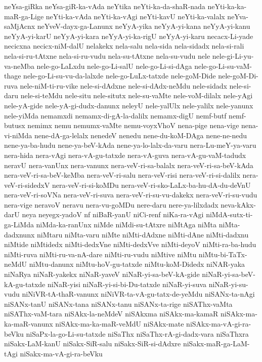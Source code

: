 {neYsa-giRka
neYsa-giR-ka-vAda
neYtika
neYti-ka-da-shaR-nada
neYti-ka-ka-maR-ga-Lige
neYti-ka-vAda
neYti-ka-vAgi
neYti-kavU
neYti-ka-valalx
neYva-saMjAcnx
neYveV-dayx-ga-Lanunx
neYyA-yika
neYyA-yi-kana
neYyA-yi-kanu
neYyA-yi-karU
neYyA-yi-kara
neYyA-yi-ka-rigU
neYyA-yi-karu
necacx-Li-yade
necicxna
necicx-niM-dalU
nelakekx
nela-salu
nela-sida
nela-sidadx
nela-si-rali
nela-si-ru-tAtxne
nela-si-ru-vudu
nela-su-tAtxne
nela-su-vudu
nele
nele-gi-Li-yu-va-neMba
nele-go-LaLxdu
nele-go-Li-salU
nele-go-Li-si-dAga
nele-go-Li-su-vaM-thage
nele-go-Li-su-vu-da-lalxde
nele-go-LuLx-tatxde
nele-goM-Dide
nele-goM-Di-ruva
nele-niM-ti-ru-vike
nele-si-dAdxne
nele-si-dAdx-neMdu
nele-sidadx
nele-si-daru
nele-si-teMdu
nele-situ
nele-situtx
nele-su-vaMte
nele-voM-dilalx
nele-yAgi
nele-yA-gide
nele-yA-gi-dudx-danunx
neleyU
nele-yalUlx
nele-yalilx
nele-yanunx
nele-yiMda
nemamxdi
nemamx-di-gA-la-dalilx
nemamx-digU
nemf-butf
nemf-butusx
nemimx
nemu
nemumx-vaMte
nemu-voyxVhoV
nena-pige
nena-vige
nena-vi-niMda
nene-dA-ga-lelalx
nenedeV
nenedu
nene-du-koM-DAga
nene-ne-nedu
nene-ya-ba-hudu
nene-ya-beV-kAda
nene-ya-lo-lalx-da-varu
nera-Lu-meY-ya-varu
nera-hida
nera-vAgi
nera-vA-gu-tatxde
nera-vA-guva
nera-vA-gu-vaM-tadudx
neravU
nera-vanUnx
nera-vanunx
nera-veV-ri-sa-balalx
nera-veV-ri-sa-beV-kAda
nera-veV-ri-sa-beV-keMba
nera-veV-ri-salu
nera-veV-risi
nera-veV-ri-si-dalilx
nera-veV-ri-sidedxV
nera-veV-ri-si-koMDu
nera-veV-ri-sko-LaLx-ba-hu-dA-du-deVnU
nera-veV-ri-soVNa
nera-veV-ri-suva
nera-veV-ri-su-vu-dakekx
nera-veV-ri-su-vudu
nera-vige
neravoV
neravu
nera-vu-goMDu
nere-daru
nere-ya-lilxdadx
neva-kAkx-darU
neya
neyegx-yadoV
nf
niBaR-yanU
niCi-renf
niKa-ra-vAgi
niMdA-sutx-ti-ga-LiMda
niMda-ka-ranUnx
niMde
niMdi-su-tAtxre
niMtAga
niMta
niMta-dadxnunx
niMtaru
niMta-varu
niMte
niMti-dAdxne
niMti-dAne
niMti-dadxnu
niMtide
niMtidedx
niMti-dedxVne
niMti-dedxVve
niMti-deyoV
niMti-ra-ba-hudu
niMti-ruva
niMti-ru-va-nA-dare
niMti-ru-vudu
niMtive
niMtu
niMtu-bi-TaTx-neMdU
niMtu-danunx
niMtu-hoV-gu-tatxde
niMtu-koM-Didedx
niNAR-yaka
niNaRya
niNaR-yakekx
niNaR-yaveV
niNaR-yi-sa-beV-kA-gide
niNaR-yi-sa-beV-kA-gu-tatxde
niNaR-yisi
niNaR-yi-si-bi-Du-tatxde
niNaR-yi-suva
niNaR-yi-su-vudu
niNiVR-tA-thaR-vanunx
niNiVR-ta-vA-gu-tatx-de-yeMdu
niSANx-ta-nAgi
niSANx-tanU
niSANx-tana
niSANx-tanu
niSANx-ta-rige
niSAThx-vaMta
niSAThx-vaM-tara
niSAkx-la-neMdeV
niSAkxma
niSAkx-ma-kamaR
niSAkx-ma-ka-maR-vanunx
niSAkx-ma-ka-maR-veMdU
niSAkx-mate
niSAkx-ma-vA-gi-ra-beVku
niSaPx-la-go-Li-su-tatxde
niSaThx
niSaThx-rA-gi-dadx-vara
niSaThxra
niSakx-LaM-kanU
niSakx-SiR-salu
niSakx-SiR-si-dAdxre
niSakx-maR-ga-LaM-tAgi
niSakx-ma-vA-gi-ra-beVku
}
